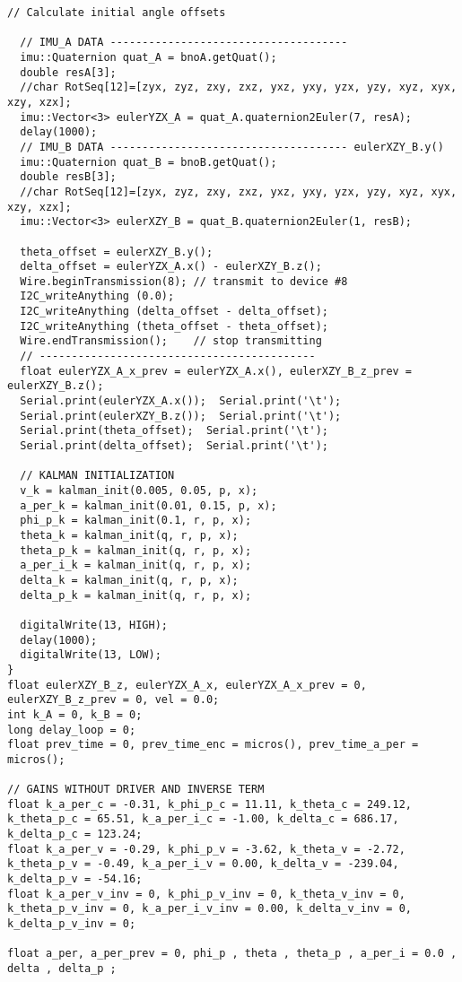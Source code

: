 \begin{lstlisting}[style=codearduino]
  // Calculate initial angle offsets

  // IMU_A DATA -------------------------------------
  imu::Quaternion quat_A = bnoA.getQuat();
  double resA[3];
  //char RotSeq[12]=[zyx, zyz, zxy, zxz, yxz, yxy, yzx, yzy, xyz, xyx, xzy, xzx];
  imu::Vector<3> eulerYZX_A = quat_A.quaternion2Euler(7, resA);
  delay(1000);
  // IMU_B DATA ------------------------------------- eulerXZY_B.y()
  imu::Quaternion quat_B = bnoB.getQuat();
  double resB[3];
  //char RotSeq[12]=[zyx, zyz, zxy, zxz, yxz, yxy, yzx, yzy, xyz, xyx, xzy, xzx];
  imu::Vector<3> eulerXZY_B = quat_B.quaternion2Euler(1, resB);

  theta_offset = eulerXZY_B.y();
  delta_offset = eulerYZX_A.x() - eulerXZY_B.z();
  Wire.beginTransmission(8); // transmit to device #8
  I2C_writeAnything (0.0);
  I2C_writeAnything (delta_offset - delta_offset);
  I2C_writeAnything (theta_offset - theta_offset);
  Wire.endTransmission();    // stop transmitting
  // -------------------------------------------
  float eulerYZX_A_x_prev = eulerYZX_A.x(), eulerXZY_B_z_prev = eulerXZY_B.z();
  Serial.print(eulerYZX_A.x());  Serial.print('\t');
  Serial.print(eulerXZY_B.z());  Serial.print('\t');
  Serial.print(theta_offset);  Serial.print('\t');
  Serial.print(delta_offset);  Serial.print('\t');

  // KALMAN INITIALIZATION
  v_k = kalman_init(0.005, 0.05, p, x);
  a_per_k = kalman_init(0.01, 0.15, p, x);
  phi_p_k = kalman_init(0.1, r, p, x);
  theta_k = kalman_init(q, r, p, x);
  theta_p_k = kalman_init(q, r, p, x);
  a_per_i_k = kalman_init(q, r, p, x);
  delta_k = kalman_init(q, r, p, x);
  delta_p_k = kalman_init(q, r, p, x);

  digitalWrite(13, HIGH);
  delay(1000);
  digitalWrite(13, LOW);
}
float eulerXZY_B_z, eulerYZX_A_x, eulerYZX_A_x_prev = 0, eulerXZY_B_z_prev = 0, vel = 0.0;
int k_A = 0, k_B = 0;
long delay_loop = 0;
float prev_time = 0, prev_time_enc = micros(), prev_time_a_per = micros();

// GAINS WITHOUT DRIVER AND INVERSE TERM
float k_a_per_c = -0.31, k_phi_p_c = 11.11, k_theta_c = 249.12, k_theta_p_c = 65.51, k_a_per_i_c = -1.00, k_delta_c = 686.17, k_delta_p_c = 123.24;
float k_a_per_v = -0.29, k_phi_p_v = -3.62, k_theta_v = -2.72, k_theta_p_v = -0.49, k_a_per_i_v = 0.00, k_delta_v = -239.04, k_delta_p_v = -54.16;
float k_a_per_v_inv = 0, k_phi_p_v_inv = 0, k_theta_v_inv = 0, k_theta_p_v_inv = 0, k_a_per_i_v_inv = 0.00, k_delta_v_inv = 0, k_delta_p_v_inv = 0;

float a_per, a_per_prev = 0, phi_p , theta , theta_p , a_per_i = 0.0 , delta , delta_p ;


\end{lstlisting}
